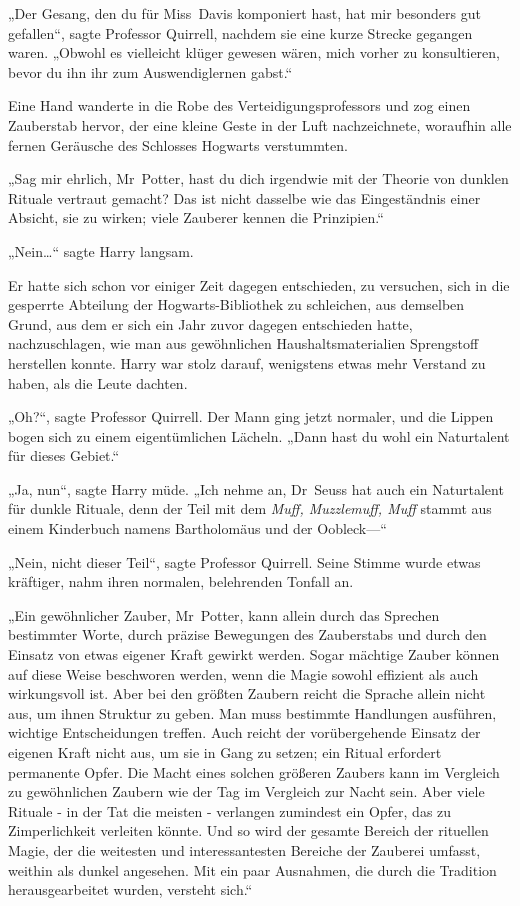 {„Der Gesang, den du für Miss~Davis komponiert hast, hat mir besonders gut gefallen“, sagte Professor Quirrell, nachdem sie eine kurze Strecke gegangen waren. „Obwohl es vielleicht klüger gewesen wären, mich vorher zu konsultieren, bevor du ihn ihr zum Auswendiglernen gabst.“

Eine Hand wanderte in die Robe des Verteidigungsprofessors und zog einen Zauberstab hervor, der eine kleine Geste in der Luft nachzeichnete, woraufhin alle fernen Geräusche des Schlosses Hogwarts verstummten.

„Sag mir ehrlich, Mr~Potter, hast du dich irgendwie mit der Theorie von dunklen Rituale vertraut gemacht? Das ist nicht dasselbe wie das Eingeständnis einer Absicht, sie zu wirken; viele Zauberer kennen die Prinzipien.“

„Nein…“ sagte Harry langsam.

Er hatte sich schon vor einiger Zeit dagegen entschieden, zu versuchen, sich in die gesperrte Abteilung der Hogwarts-Bibliothek zu schleichen, aus demselben Grund, aus dem er sich ein Jahr zuvor dagegen entschieden hatte, nachzuschlagen, wie man aus gewöhnlichen Haushaltsmaterialien Sprengstoff herstellen konnte. Harry war stolz darauf, wenigstens etwas mehr Verstand zu haben, als die Leute dachten.

„Oh?“, sagte Professor Quirrell. Der Mann ging jetzt normaler, und die Lippen bogen sich zu einem eigentümlichen Lächeln. „Dann hast du wohl ein Naturtalent für dieses Gebiet.“

„Ja, nun“, sagte Harry müde. „Ich nehme an, Dr~Seuss hat auch ein Naturtalent für dunkle Rituale, denn der Teil mit dem \emph{Muff, Muzzlemuff, Muff} stammt aus einem Kinderbuch namens Bartholomäus und der Oobleck—“

„Nein, nicht dieser Teil“, sagte Professor Quirrell. Seine Stimme wurde etwas kräftiger, nahm ihren normalen, belehrenden Tonfall an.

„Ein gewöhnlicher Zauber, Mr~Potter, kann allein durch das Sprechen bestimmter Worte, durch präzise Bewegungen des Zauberstabs und durch den Einsatz von etwas eigener Kraft gewirkt werden. Sogar mächtige Zauber können auf diese Weise beschworen werden, wenn die Magie sowohl effizient als auch wirkungsvoll ist. Aber bei den größten Zaubern reicht die Sprache allein nicht aus, um ihnen Struktur zu geben. Man muss bestimmte Handlungen ausführen, wichtige Entscheidungen treffen. Auch reicht der vorübergehende Einsatz der eigenen Kraft nicht aus, um sie in Gang zu setzen; ein Ritual erfordert permanente Opfer. Die Macht eines solchen größeren Zaubers kann im Vergleich zu gewöhnlichen Zaubern wie der Tag im Vergleich zur Nacht sein. Aber viele Rituale - in der Tat die meisten - verlangen zumindest ein Opfer, das zu Zimperlichkeit verleiten könnte. Und so wird der gesamte Bereich der rituellen Magie, der die weitesten und interessantesten Bereiche der Zauberei umfasst, weithin als dunkel angesehen. Mit ein paar Ausnahmen, die durch die Tradition herausgearbeitet wurden, versteht sich.“

}
